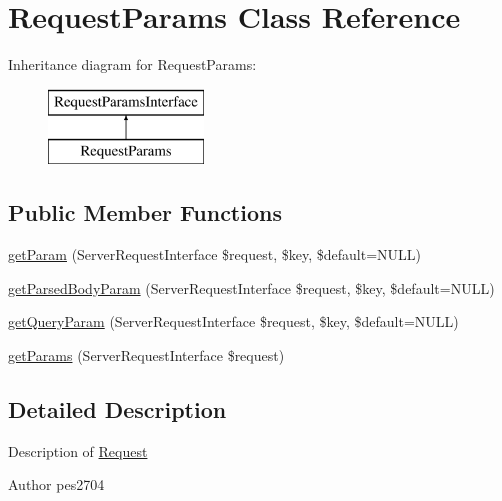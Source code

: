 \hypertarget{class_pes_1_1_http_1_1_request_1_1_request_params}{}\section{Request\+Params Class Reference}
\label{class_pes_1_1_http_1_1_request_1_1_request_params}
Inheritance diagram for Request\+Params\+:\begin{figure}[H]
\begin{center}
\leavevmode
\includegraphics[height=2.000000cm]{class_pes_1_1_http_1_1_request_1_1_request_params}
\end{center}
\end{figure}
\subsection*{Public Member Functions}
\begin{DoxyCompactItemize}
\item 
\mbox{\hyperlink{class_pes_1_1_http_1_1_request_1_1_request_params_a3293ae069cee967716d29c8d5ab14755}{get\+Param}} (Server\+Request\+Interface \$request, \$key, \$default=N\+U\+LL)
\item 
\mbox{\hyperlink{class_pes_1_1_http_1_1_request_1_1_request_params_a29e01720b8186851ed442d4631b84801}{get\+Parsed\+Body\+Param}} (Server\+Request\+Interface \$request, \$key, \$default=N\+U\+LL)
\item 
\mbox{\hyperlink{class_pes_1_1_http_1_1_request_1_1_request_params_a2e5741fedbbdec989996e8e31d1f4b45}{get\+Query\+Param}} (Server\+Request\+Interface \$request, \$key, \$default=N\+U\+LL)
\item 
\mbox{\hyperlink{class_pes_1_1_http_1_1_request_1_1_request_params_ab8608dd4c8a0447d65e8f48dcec561b7}{get\+Params}} (Server\+Request\+Interface \$request)
\end{DoxyCompactItemize}


\subsection{Detailed Description}
Description of \mbox{\hyperlink{class_pes_1_1_http_1_1_request}{Request}}

\begin{DoxyAuthor}{Author}
pes2704 
\end{DoxyAuthor}



